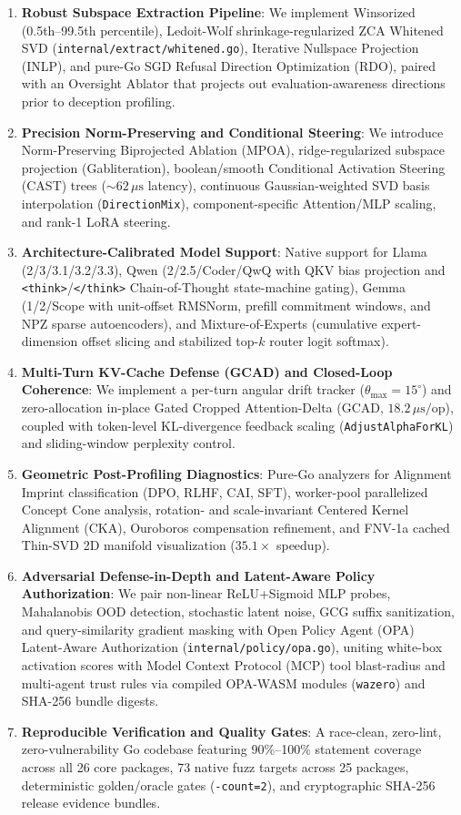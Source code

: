 \documentclass{article}
\begin{document}
\begin{enumerate}
    \item \textbf{Robust Subspace Extraction Pipeline}: We implement Winsorized (0.5th--99.5th percentile), Ledoit-Wolf shrinkage-regularized ZCA Whitened SVD (\texttt{internal/extract/whitened.go}), Iterative Nullspace Projection (INLP), and pure-Go SGD Refusal Direction Optimization (RDO), paired with an Oversight Ablator that projects out evaluation-awareness directions prior to deception profiling.
    \item \textbf{Precision Norm-Preserving and Conditional Steering}: We introduce Norm-Preserving Biprojected Ablation (MPOA), ridge-regularized subspace projection (Gabliteration), boolean/smooth Conditional Activation Steering (CAST) trees ($\sim 62\,\mu\text{s}$ latency), continuous Gaussian-weighted SVD basis interpolation (\texttt{DirectionMix}), component-specific Attention/MLP scaling, and rank-1 LoRA steering.
    \item \textbf{Architecture-Calibrated Model Support}: Native support for Llama (2/3/3.1/3.2/3.3), Qwen (2/2.5/Coder/QwQ with QKV bias projection and \texttt{<think>}/\texttt{</think>} Chain-of-Thought state-machine gating), Gemma (1/2/Scope with unit-offset RMSNorm, prefill commitment windows, and NPZ sparse autoencoders), and Mixture-of-Experts (cumulative expert-dimension offset slicing and stabilized top-$k$ router logit softmax).
    \item \textbf{Multi-Turn KV-Cache Defense (GCAD) and Closed-Loop Coherence}: We implement a per-turn angular drift tracker ($\theta_{\max} = 15^\circ$) and zero-allocation in-place Gated Cropped Attention-Delta (GCAD, $18.2\,\mu\text{s/op}$), coupled with token-level KL-divergence feedback scaling (\texttt{AdjustAlphaForKL}) and sliding-window perplexity control.
    \item \textbf{Geometric Post-Profiling Diagnostics}: Pure-Go analyzers for Alignment Imprint classification (DPO, RLHF, CAI, SFT), worker-pool parallelized Concept Cone analysis, rotation- and scale-invariant Centered Kernel Alignment (CKA), Ouroboros compensation refinement, and FNV-1a cached Thin-SVD 2D manifold visualization ($35.1\times$ speedup).
    \item \textbf{Adversarial Defense-in-Depth and Latent-Aware Policy Authorization}: We pair non-linear ReLU+Sigmoid MLP probes, Mahalanobis OOD detection, stochastic latent noise, GCG suffix sanitization, and query-similarity gradient masking with Open Policy Agent (OPA) Latent-Aware Authorization (\texttt{internal/policy/opa.go}), uniting white-box activation scores with Model Context Protocol (MCP) tool blast-radius and multi-agent trust rules via compiled OPA-WASM modules (\texttt{wazero}) and SHA-256 bundle digests.
    \item \textbf{Reproducible Verification and Quality Gates}: A race-clean, zero-lint, zero-vulnerability Go codebase featuring 90\%--100\% statement coverage across all 26 core packages, 73 native fuzz targets across 25 packages, deterministic golden/oracle gates (\texttt{-count=2}), and cryptographic SHA-256 release evidence bundles.
\end{enumerate}
\end{document}
